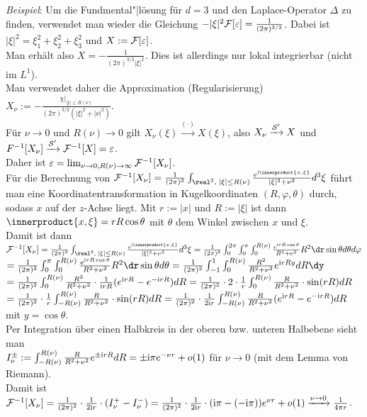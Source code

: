 \emph{Beispiel}:
Um die Fundmental"|lösung für $d = 3$ und den Laplace-Operator $\Delta$
zu finden, verwendet man wieder die Gleichung
$-|\xi|^2 \F[\varepsilon] = \frac{1}{(2\pi)^{3/2}}$.
Dabei ist $|\xi|^2 = \xi_1^2 + \xi_2^2 + \xi_3^2$ und
$X := \F[\varepsilon]$.\\
Man erhält also $X = -\frac{1}{(2\pi)^{3/2} |\xi|^2}$.
Dies ist allerdings nur lokal integrierbar (nicht im $L^1$).\\
Man verwendet daher die Approximation (Regularisierung)
$X_\nu := -\frac{\chi|_{|\xi| \le R(\nu)}}
{(2\pi)^{3/2} (|\xi|^2 + |\nu|^2)}$.\\
Für $\nu \to 0$ und $R(\nu) \to 0$ gilt
$X_\nu(\xi) \xrightarrow{(\cdot)} X(\xi)$,
also $X_\nu \xrightarrow{\S'} X$ und
$F^{-1}[X_\nu] \xrightarrow{\S'} \F^{-1}[X] = \varepsilon$.\\
Daher ist $\varepsilon = \lim_{\nu \to 0, R(\nu) \to \infty} \F^{-1}[X_\nu]$.\\
Für die Berechnung von
$\F^{-1}[X_\nu] = \frac{1}{(2\pi)^3} \int_{\real^3,\; |\xi| \le R(\nu)}
\frac{e^{\i\innerproduct{x, \xi}}}{|\xi|^2 + \nu^2}d^3\xi$ führt man eine
Koordinatentransformation in Kugelkoordinaten $(R, \varphi, \theta)$
durch, sodass $x$ auf der $z$-Achse liegt.
Mit $r := |x|$ und $R := |\xi|$ ist dann $\innerproduct{x, \xi} = rR\cos \theta$
mit $\theta$ dem Winkel zwischen $x$ und $\xi$.\\
Damit ist dann
$\F^{-1}[X_\nu] = \frac{1}{(2\pi)^3} \int_{\real^3,\; |\xi| \le R(\nu)}
\frac{e^{\i\innerproduct{x, \xi}}}{|\xi|^2 + \nu^2}d^3\xi =
\frac{1}{(2\pi)^3} \int_0^{2\pi} \int_0^\pi \int_0^{R(\nu)}
\frac{e^{\i rR\cos \theta}}{R^2 + \nu^2} R^2 \dr \sin \theta d\theta d\varphi$\\
$= \frac{1}{(2\pi)^2} \int_0^\pi \int_0^{R(\nu)}
\frac{e^{\i rR\cos \theta}}{R^2 + \nu^2} R^2 \dr \sin \theta d\theta =
\frac{1}{(2\pi)^2} \int_{-1}^1 \int_0^{R(\nu)} \frac{R^2}{R^2 + \nu^2}
e^{\i rRy} dR\dy$\\
$= \frac{1}{(2\pi)^2} \int_0^{R(\nu)} \frac{R^2}{R^2 + \nu^2} \cdot
\frac{1}{\i rR} (e^{\i rR} - e^{-\i rR}) dR =
\frac{1}{(2\pi)^2} \cdot 2 \cdot \frac{1}{r}
\int_0^{R(\nu)} \frac{R}{R^2 + \nu^2} \cdot \sin(rR) dR$\\
$= \frac{1}{(2\pi)^2} \cdot \frac{1}{r}
\int_{-R(\nu)}^{R(\nu)} \frac{R}{R^2 + \nu^2} \cdot \sin(rR) dR =
\frac{1}{(2\pi)^2} \cdot \frac{1}{2\i r}
\int_{-R(\nu)}^{R(\nu)} \frac{R}{R^2 + \nu^2} (e^{\i rR} - e^{-\i rR}) dR$
mit $y = \cos \theta$.\\
Per Integration über einen Halbkreis in der oberen bzw. unteren Halbebene
sieht man\\
$I_\nu^\pm := \int_{-R(\nu)}^{R(\nu)}
\frac{R}{R^2 + \nu^2} e^{\pm\i rR}dR = \pm\i\pi e^{-\nu r} + o(1)$ für
$\nu \to 0$ (mit dem Lemma von Riemann).\\
Damit ist $\F^{-1}[X_\nu] =
\frac{1}{(2\pi)^2} \cdot \frac{1}{2\i r} \cdot (I_\nu^+ - I_\nu^-) =
\frac{1}{(2\pi)^2} \cdot \frac{1}{2\i r} \cdot (\i\pi - (-\i\pi))e^{\nu r} +
o(1) \xrightarrow{\nu \to 0} \frac{1}{4\pi r}$.

\pagebreak
